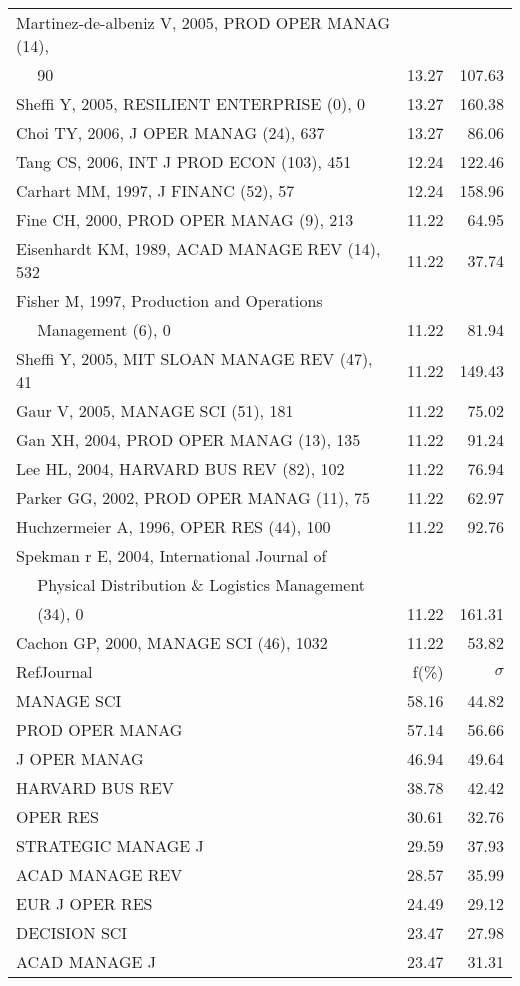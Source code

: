 \documentclass[a4paper,11pt]{report}
\begin{document}
\begin{landscape}
\begin{table}[!ht]
{\begin{tabular}{|l r r|}
Martinez-de-albeniz V, 2005, PROD OPER MANAG (14), &  & \\
$\quad$ 90 & 13.27 & 107.63\\
Sheffi Y, 2005, RESILIENT ENTERPRISE (0), 0 & 13.27 & 160.38\\
Choi TY, 2006, J OPER MANAG (24), 637 & 13.27 & 86.06\\
Tang CS, 2006, INT J PROD ECON (103), 451 & 12.24 & 122.46\\
Carhart MM, 1997, J FINANC (52), 57 & 12.24 & 158.96\\
Fine CH, 2000, PROD OPER MANAG (9), 213 & 11.22 & 64.95\\
Eisenhardt KM, 1989, ACAD MANAGE REV (14), 532 & 11.22 & 37.74\\
Fisher M, 1997, Production and Operations &  & \\
$\quad$ Management (6), 0 & 11.22 & 81.94\\
Sheffi Y, 2005, MIT SLOAN MANAGE REV (47), 41 & 11.22 & 149.43\\
Gaur V, 2005, MANAGE SCI (51), 181 & 11.22 & 75.02\\
Gan XH, 2004, PROD OPER MANAG (13), 135 & 11.22 & 91.24\\
Lee HL, 2004, HARVARD BUS REV (82), 102 & 11.22 & 76.94\\
Parker GG, 2002, PROD OPER MANAG (11), 75 & 11.22 & 62.97\\
Huchzermeier A, 1996, OPER RES (44), 100 & 11.22 & 92.76\\
Spekman r E, 2004, International Journal of &  & \\
$\quad$ Physical Distribution \& Logistics Management &  & \\
$\quad$ (34), 0 & 11.22 & 161.31\\
Cachon GP, 2000, MANAGE SCI (46), 1032 & 11.22 & 53.82\\
\hline
\hline
RefJournal & f(\%) & $\sigma$\\
\hline
MANAGE SCI & 58.16 & 44.82\\
PROD OPER MANAG & 57.14 & 56.66\\
J OPER MANAG & 46.94 & 49.64\\
HARVARD BUS REV & 38.78 & 42.42\\
OPER RES & 30.61 & 32.76\\
STRATEGIC MANAGE J & 29.59 & 37.93\\
ACAD MANAGE REV & 28.57 & 35.99\\
EUR J OPER RES & 24.49 & 29.12\\
DECISION SCI & 23.47 & 27.98\\
ACAD MANAGE J & 23.47 & 31.31\\
\hline
\end{tabular}
}
\end{table}

\end{landscape}
\end{document}
